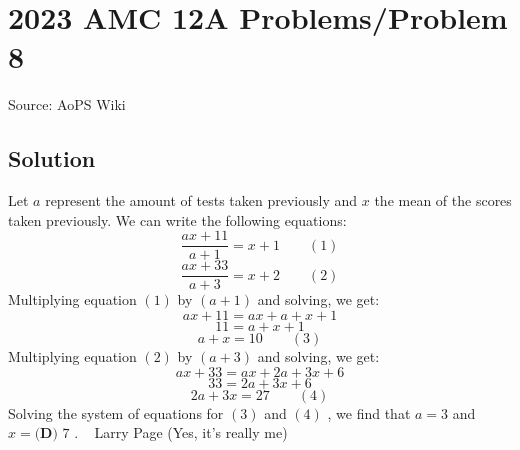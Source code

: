 \documentclass[12pt]{article}
\begin{document}
\section*{{2023 AMC 12A Problems/Problem 8}}
Source: AoPS Wiki

\subsection*{Solution}
Let $a$ represent the amount of tests taken previously and $x$ the mean of the scores taken previously. We can write the following equations: \[\frac{ax+11}{a+1}=x+1\qquad (1)\] \[\frac{ax+33}{a+3}=x+2\qquad (2)\] Multiplying equation $(1)$ by $(a+1)$ and solving, we get: \[ax+11=ax+a+x+1\] \[11=a+x+1\] \[a+x=10\qquad (3)\] Multiplying equation $(2)$ by $(a+3)$ and solving, we get: \[ax+33=ax+2a+3x+6\] \[33=2a+3x+6\] \[2a+3x=27\qquad (4)\] Solving the system of equations for $(3)$ and $(4)$ , we find that $a=3$ and $x=\boxed{\textbf{(D) }7}$ . ~ Larry Page (Yes, it's really me)
\end{document}
